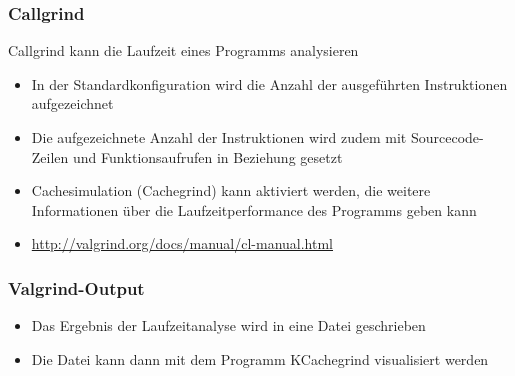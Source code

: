 \subsubsection{Callgrind}
Callgrind kann die Laufzeit eines Programms analysieren
\begin{itemize}
    \item In der Standardkonfiguration wird die Anzahl der ausgeführten Instruktionen aufgezeichnet
    \item Die aufgezeichnete Anzahl der Instruktionen wird zudem mit Sourcecode-Zeilen und Funktionsaufrufen in Beziehung gesetzt
    \item Cachesimulation (Cachegrind) kann aktiviert werden, die weitere Informationen über die Laufzeitperformance des Programms geben kann
    \item \url{http://valgrind.org/docs/manual/cl-manual.html}
\end{itemize}
\subsubsection{Valgrind-Output}
\begin{itemize}
    \item Das Ergebnis der Laufzeitanalyse wird in eine Datei geschrieben
    \item Die Datei kann dann mit dem Programm KCachegrind visualisiert werden
\end{itemize}
